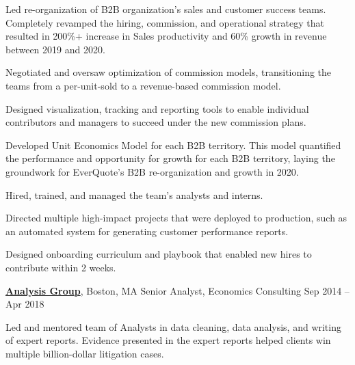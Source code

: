 \documentclass[letterpaper,10pt,oneside]{article}
\begin{document}
\begin{body}
\begin{flushleft}
\BulletItem Led re-organization of B2B organization's sales and customer success teams. Completely revamped the hiring, commission, and operational strategy that resulted in 200\%+ increase in Sales productivity and 60\% growth in revenue between 2019 and 2020.

\vspace{0.5em} \SubBulletItem 	Negotiated and oversaw optimization of commission models, transitioning the teams from a per-unit-sold to a revenue-based commission model. 

\vspace{0.5em} \SubBulletItem 	Designed visualization, tracking and reporting tools to enable individual contributors and managers to succeed under the new commission plans. 

\vspace{0.5em} \SubBulletItem 	Developed Unit Economics Model for each B2B territory. This model quantified the performance and opportunity for growth for each B2B territory, laying the groundwork for EverQuote's B2B re-organization and growth in 2020.

\vspace{0.75em}
\BulletItem Hired, trained, and managed the team's analysts and interns. 

\vspace{0.5em} \SubBulletItem Directed multiple high-impact projects that were deployed to production, such as an automated system for generating customer performance reports.

\vspace{0.5em} \SubBulletItem Designed onboarding curriculum and playbook that enabled new hires to contribute within 2 weeks. 

\end{flushleft}

\vspace{0.75em}
\href{http://www.analysisgroup.com/}
{\textbf{Analysis Group}},
Boston, MA
\GapNoBreak
Senior Analyst,
Economics Consulting
\hfill
Sep 2014 --
Apr 2018
\begin{flushleft}

\BulletItem Led and mentored team of Analysts in data cleaning, data analysis, and writing of expert reports. Evidence presented in the expert reports helped clients win multiple billion-dollar litigation cases.

\end{flushleft}



\end{body}
\end{document}
